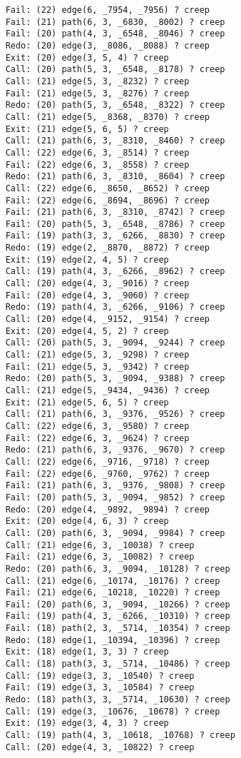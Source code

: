 \documentclass{article}
\begin{document}
\begin{lstlisting}
	Fail: (22) edge(6, _7954, _7956) ? creep
	Fail: (21) path(6, 3, _6830, _8002) ? creep
	Fail: (20) path(4, 3, _6548, _8046) ? creep
	Redo: (20) edge(3, _8086, _8088) ? creep
	Exit: (20) edge(3, 5, 4) ? creep
	Call: (20) path(5, 3, _6548, _8178) ? creep
	Call: (21) edge(5, 3, _8232) ? creep
	Fail: (21) edge(5, 3, _8276) ? creep
	Redo: (20) path(5, 3, _6548, _8322) ? creep
	Call: (21) edge(5, _8368, _8370) ? creep
	Exit: (21) edge(5, 6, 5) ? creep
	Call: (21) path(6, 3, _8310, _8460) ? creep
	Call: (22) edge(6, 3, _8514) ? creep
	Fail: (22) edge(6, 3, _8558) ? creep
	Redo: (21) path(6, 3, _8310, _8604) ? creep
	Call: (22) edge(6, _8650, _8652) ? creep
	Fail: (22) edge(6, _8694, _8696) ? creep
	Fail: (21) path(6, 3, _8310, _8742) ? creep
	Fail: (20) path(5, 3, _6548, _8786) ? creep
	Fail: (19) path(3, 3, _6266, _8830) ? creep
	Redo: (19) edge(2, _8870, _8872) ? creep
	Exit: (19) edge(2, 4, 5) ? creep
	Call: (19) path(4, 3, _6266, _8962) ? creep
	Call: (20) edge(4, 3, _9016) ? creep
	Fail: (20) edge(4, 3, _9060) ? creep
	Redo: (19) path(4, 3, _6266, _9106) ? creep
	Call: (20) edge(4, _9152, _9154) ? creep
	Exit: (20) edge(4, 5, 2) ? creep
	Call: (20) path(5, 3, _9094, _9244) ? creep
	Call: (21) edge(5, 3, _9298) ? creep
	Fail: (21) edge(5, 3, _9342) ? creep
	Redo: (20) path(5, 3, _9094, _9388) ? creep
	Call: (21) edge(5, _9434, _9436) ? creep
	Exit: (21) edge(5, 6, 5) ? creep
	Call: (21) path(6, 3, _9376, _9526) ? creep
	Call: (22) edge(6, 3, _9580) ? creep
	Fail: (22) edge(6, 3, _9624) ? creep
	Redo: (21) path(6, 3, _9376, _9670) ? creep
	Call: (22) edge(6, _9716, _9718) ? creep
	Fail: (22) edge(6, _9760, _9762) ? creep
	Fail: (21) path(6, 3, _9376, _9808) ? creep
	Fail: (20) path(5, 3, _9094, _9852) ? creep
	Redo: (20) edge(4, _9892, _9894) ? creep
	Exit: (20) edge(4, 6, 3) ? creep
	Call: (20) path(6, 3, _9094, _9984) ? creep
	Call: (21) edge(6, 3, _10038) ? creep
	Fail: (21) edge(6, 3, _10082) ? creep
	Redo: (20) path(6, 3, _9094, _10128) ? creep
	Call: (21) edge(6, _10174, _10176) ? creep
	Fail: (21) edge(6, _10218, _10220) ? creep
	Fail: (20) path(6, 3, _9094, _10266) ? creep
	Fail: (19) path(4, 3, _6266, _10310) ? creep
	Fail: (18) path(2, 3, _5714, _10354) ? creep
	Redo: (18) edge(1, _10394, _10396) ? creep
	Exit: (18) edge(1, 3, 3) ? creep
	Call: (18) path(3, 3, _5714, _10486) ? creep
	Call: (19) edge(3, 3, _10540) ? creep
	Fail: (19) edge(3, 3, _10584) ? creep
	Redo: (18) path(3, 3, _5714, _10630) ? creep
	Call: (19) edge(3, _10676, _10678) ? creep
	Exit: (19) edge(3, 4, 3) ? creep
	Call: (19) path(4, 3, _10618, _10768) ? creep
	Call: (20) edge(4, 3, _10822) ? creep

\end{lstlisting}
\end{document}

